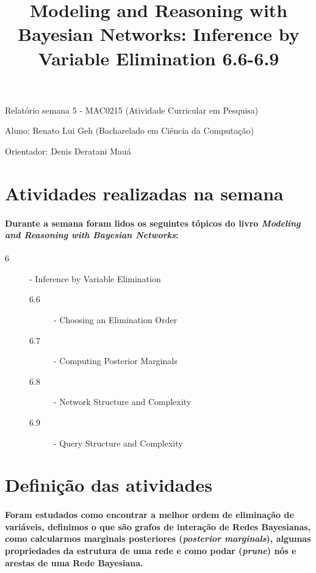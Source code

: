 \documentclass[a4paper,10pt]{article}
\title{\textbf{Modeling and Reasoning with Bayesian Networks: Inference by Variable Elimination 6.6-6.9}}
\theoremstyle{plain}
\begin{document}
\date{}
\author{}
\vspace*{-40pt}
{\let\newpage\relax\maketitle}

Relatório semana 5 - MAC0215 (Atividade Curricular em Pesquisa)

Aluno: Renato Lui Geh (Bacharelado em Ciência da Computação)

Orientador: Denis Deratani Mauá

\section{Atividades realizadas na semana}

\paragraph{
  Durante a semana foram lidos os seguintes tópicos do livro \textit{Modeling and Reasoning with
  Bayesian Networks}\cite{bayes-net-darwiche}:
}

\begin{description}
  \item[6] - Inference by Variable Elimination
  \begin{description}
    \item[6.6] - Choosing an Elimination Order
    \item[6.7] - Computing Posterior Marginals
    \item[6.8] - Network Structure and Complexity
    \item[6.9] - Query Structure and Complexity
  \end{description}
\end{description}

\section{Definição das atividades}

\paragraph{
  Foram estudados como encontrar a melhor ordem de eliminação de variáveis\cite{report-2},
  definimos o que são grafos de interação de Redes Bayesianas, como calcularmos marginais
  posteriores (\textit{posterior marginals}), algumas propriedades da estrutura de uma rede e como
  podar (\textit{prune}) nós e arestas de uma Rede Bayesiana.
}
\end{document}
